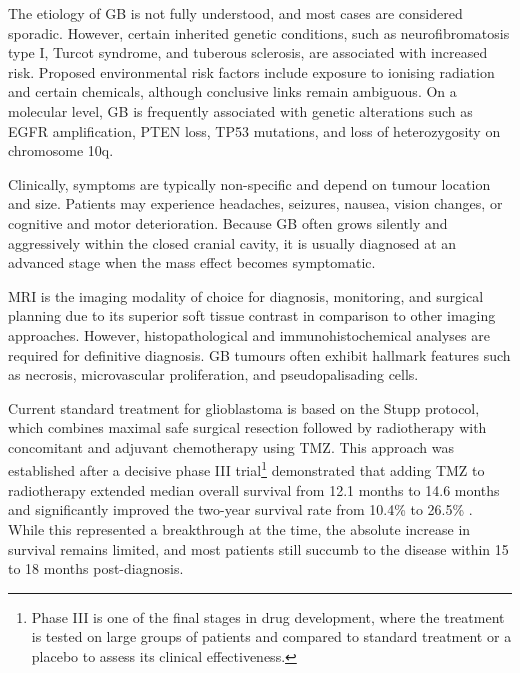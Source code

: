 \documentclass[12pt, a4paper]{report}
\begin{document}
The etiology of GB is not fully understood, and most cases are considered sporadic. However, certain inherited genetic conditions, such as neurofibromatosis type I, Turcot syndrome, and tuberous sclerosis, are associated with increased risk. Proposed environmental risk factors include exposure to ionising radiation and certain chemicals, although conclusive links remain ambiguous. On a molecular level, GB is frequently associated with genetic alterations such as EGFR amplification, PTEN loss, TP53 mutations, and loss of heterozygosity on chromosome 10q.

Clinically, symptoms are typically non-specific and depend on tumour location and size. Patients may experience headaches, seizures, nausea, vision changes, or cognitive and motor deterioration. Because GB often grows silently and aggressively within the closed cranial cavity, it is usually diagnosed at an advanced stage when the mass effect becomes symptomatic.

MRI is the imaging modality of choice for diagnosis, monitoring, and surgical planning due to its superior soft tissue contrast in comparison to other imaging approaches. However, histopathological and immunohistochemical analyses are required for definitive diagnosis. GB tumours often exhibit hallmark features such as necrosis, microvascular proliferation, and pseudopalisading cells.

Current standard treatment for glioblastoma is based on the Stupp protocol, which combines maximal safe surgical resection followed by radiotherapy with concomitant and adjuvant chemotherapy using TMZ. This approach was established after a decisive phase III trial\footnote{Phase III is one of the final stages in drug development, where the treatment is tested on large groups of patients and compared to standard treatment or a placebo to assess its clinical effectiveness.} demonstrated that adding TMZ to radiotherapy extended median overall survival from 12.1 months to 14.6 months and significantly improved the two-year survival rate from 10.4\% to 26.5\% \cite{Stupp2005}. While this represented a breakthrough at the time, the absolute increase in survival remains limited, and most patients still succumb to the disease within 15 to 18 months post-diagnosis.
\end{document}
